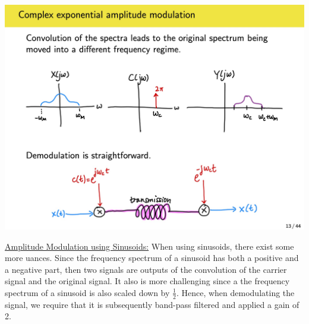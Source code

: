 \documentclass{article}
\newcommand{\sheader}[1]{\underline{#1:}}
\begin{document}
\includegraphics[scale=0.13]{exponential-modulation.jpg}

\sheader{Amplitude Modulation using Sinusoids} When using sinusoids, there exist some 
more uances. Since the frequency spectrum of a sinusoid has both a positive and 
a negative part, then two signals are outputs of the convolution of the carrier signal 
and the original signal. It also is more challenging since a the frequency spectrum of a 
sinusoid is also scaled down by $\frac{1}{2}$. Hence, when demodulating the signal,
we require that it is subsequently band-pass filtered and applied a gain of 2.
\end{document}
